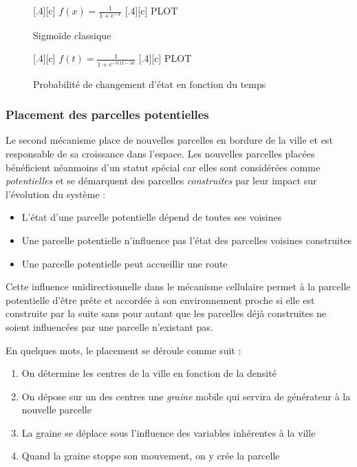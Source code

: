 \documentclass[12pt]{article}
\begin{document}
\begin{figure}[ht]
  \centering
  \subcaptionbox{}[.4\linewidth][c]{
    $f(x) = \frac{1}{1 + e^{-x}}$
  }
  \subcaptionbox{}[.4\linewidth][c]{
    PLOT
  }
  \caption{Sigmoïde classique}
  \label{fig:sigmoide1}
\end{figure}


\begin{figure}[ht]
  \centering
  \subcaptionbox{}[.4\linewidth][c]{
    $f(t) = \frac{1}{1 + e^{-0.1t-50}}$
  }
  \subcaptionbox{}[.4\linewidth][c]{
    PLOT
  }
  \caption{Probabilité de changement d'état en fonction du temps}
  \label{fig:sigmoide1}
\end{figure}

\subsubsection{Placement des parcelles potentielles}

Le second mécanisme place de nouvelles parcelles en bordure de la
ville et est responsable de sa croissance dans l'espace. Les nouvelles
parcelles placées bénéficient néanmoins d'un statut spécial car elles
sont considérées comme \textit{potentielles} et se démarquent des
parcelles \textit{construites} par leur impact sur l'évolution du
système :

\begin{itemize}
\item{L'état d'une parcelle potentielle dépend de toutes ses voisines}
\item{Une parcelle potentielle n'influence pas l'état des parcelles
  voisines construites}
\item{Une parcelle potentielle peut accueillir une route}
\end{itemize}

Cette influence unidirectionnelle dans le mécanisme cellulaire permet
à la parcelle potentielle d'être prête et accordée à son environnement
proche si elle est construite par la suite sans pour autant que les
parcelles déjà construites ne soient influencées par une parcelle
n'existant pas.

En quelques mots, le placement se déroule comme suit :

\begin{enumerate}
\item{On détermine les centres de la ville en fonction de la densité}
\item{On dépose sur un des centres une \textit{graine} mobile qui
  servira de générateur à la nouvelle parcelle}
\item{La graine se déplace sous l'influence des variables inhérentes à
  la ville}
\item{Quand la graine stoppe son mouvement, on y crée la parcelle}
\end{enumerate}
\end{document}

